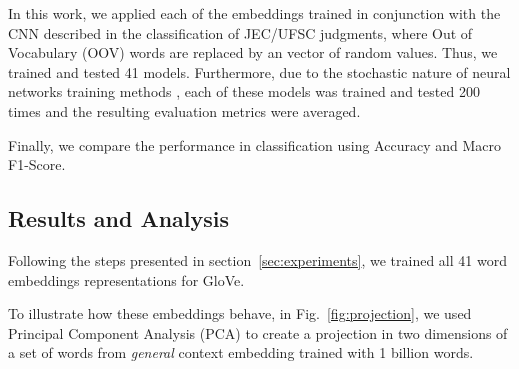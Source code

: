 In this work, we applied each of the embeddings trained in conjunction with the CNN described in the classification of JEC/UFSC judgments, where Out of Vocabulary (OOV) words are replaced by an vector of random values. Thus, we trained and tested 41 models. Furthermore, due to the stochastic nature of neural networks training methods \cite{Cohen1995}, each of these models was trained and tested 200 times and the resulting evaluation metrics were averaged. 

Finally, we compare the performance in classification using Accuracy and Macro F1-Score.





\subsection{Results and Analysis}

Following the steps presented in section~\ref{sec:experiments}, we trained all 41 word embeddings representations for GloVe. 

To illustrate how these embeddings behave, in Fig.~\ref{fig:projection}, we used Principal Component Analysis (PCA) to create a projection in two dimensions of a set of words from \textit{general} context embedding trained with 1 billion words.

